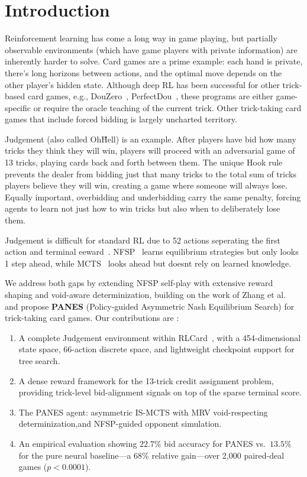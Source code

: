 \documentclass[conference]{IEEEtran}
\begin{document}
\section{\large \textbf{Introduction}}
Reinforcement learning has come a long way in game playing, but partially observable environments (which have game players with private information) are inherently harder to solve. Card games are a prime example: each hand is private, there's long horizons between actions, and the optimal move depends on the other player's hidden state. Although deep RL has been successful for other trick-based card games, e.g., DouZero~\cite{zha2021douzero}, PerfectDou~\cite{you2020perfectdou}, these programs are either game-specific or require the oracle teaching of the current trick. Other trick-taking card games that include forced bidding is largely uncharted territory.


Judgement (also called Oh\~Hell) is an example. After players have bid how many tricks they think they will win, players will proceed with an adversarial game of 13 tricks, playing cards back and forth between them. The unique Hook rule prevents the dealer from bidding just that many tricks to the total sum of tricks players believe they will win, creating a game where someone will always lose. Equally important, overbidding and underbidding carry the same penalty, forcing agents to learn not just how to win tricks but also when to deliberately lose them.

Judgement is difficult for standard RL due to 52 actions seperating the first action and terminal eeward~\cite{sutton2018reinforcement}. NFSP~\cite{silver2016deep} learns equilibrium strategies but only looks 1 step ahead, while MCTS~\cite{browne2012survey} looks ahead but doesnt rely on learned knowledge. 

We address both gaps by extending NFSP self-play with extensive reward shaping and void-aware determinization, building on the work of Zhang et al.~\cite{zhang2021mcnfsp} and propose \textbf{PANES} (Policy-guided Asymmetric Nash Equilibrium Search) for trick-taking card games. Our contributions are : 

\begin{enumerate}
    \item A complete Judgement environment within RLCard~\cite{zha2021rlcard}, with a 454-dimensional state space, 66-action discrete space, and lightweight checkpoint support for tree search.
    \item A dense reward framework for the 13-trick credit assignment problem, providing trick-level bid-alignment signals on top of the sparse terminal score.
    \item The PANES agent: asymmetric IS-MCTS with MRV void-respecting determinization,and NFSP-guided opponent simulation.
    \item An empirical evaluation showing $22.7\%$ bid accuracy for PANES vs.\ $13.5\%$ for the pure neural baseline---a $68\%$ relative gain---over 2{,}000 paired-deal games ($p < 0.0001$).
\end{enumerate}
\end{document}
